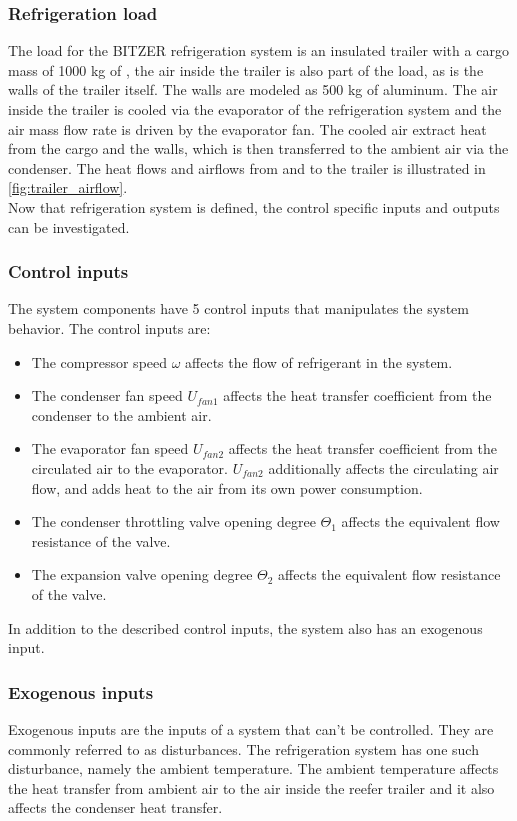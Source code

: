 \subsubsection{Refrigeration load}
The load for the BITZER refrigeration system is an insulated trailer with a cargo mass of 1000 kg of , the air inside the trailer is also part of the load, as is the walls of the trailer itself. The walls are modeled as 500 kg of aluminum. The air inside the trailer is cooled via the evaporator of the refrigeration system and the air mass flow rate is driven by the evaporator fan. The cooled air extract heat from the cargo and the walls, which is then transferred to the ambient air via the condenser. The heat flows and airflows from and to the trailer is illustrated in \cref{fig:trailer_airflow}.\\
Now that refrigeration system is defined, the control specific inputs and outputs can be investigated.\\

\subsubsection{Control inputs}
The system components have 5 control inputs that manipulates the system behavior. The control inputs are:
\begin{itemize}
	\item The compressor speed $ \omega $ affects the flow of refrigerant in the system.
	\item The condenser fan speed $ U_{fan1} $ affects the heat transfer coefficient from the condenser to the ambient air.
	\item The evaporator fan speed  $ U_{fan2} $ affects the heat transfer coefficient from the circulated air to the evaporator. $ U_{fan2} $ additionally affects the circulating air flow, and adds heat to the air from its own power consumption.
	\item The condenser throttling valve opening degree $ \Theta_1 $ affects the equivalent flow resistance of the valve.
	\item The expansion valve opening degree $ \Theta_2 $ affects the equivalent flow resistance of the valve.
\end{itemize}
In addition to the described control inputs, the system also has an exogenous input. 

\subsubsection{Exogenous inputs}
Exogenous inputs are the inputs of a system that can't be controlled. They are commonly referred to as disturbances. The refrigeration system has one such disturbance, namely the ambient temperature. The ambient temperature affects the heat transfer from ambient air to the air inside the reefer trailer and it also affects the condenser heat transfer.\\

